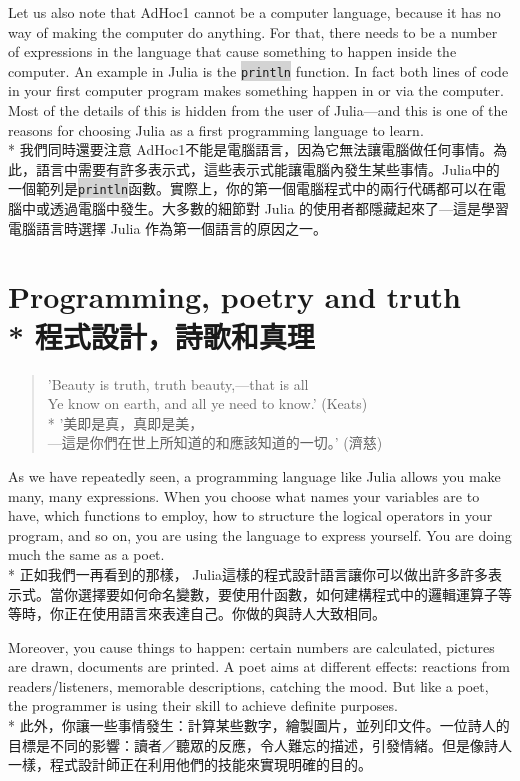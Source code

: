 \documentclass[]{article}
\newcommand{\codequote}[1]{\colorbox{lightgray}{\tt #1}}
\begin{document}
{\color{gray}Let us also note that AdHoc1 cannot be a computer language, because it has no way of making the computer do anything. For that, there needs to be a number of expressions in the language that cause something to happen inside the computer. An example in Julia is the \codequote{println} function. In fact both lines of code in your first computer program makes something happen in or via the computer. Most of the details of this is hidden from the user of Julia---and this is one of the reasons for choosing Julia as a first programming language to learn.}
\\*
{我們同時還要注意 AdHoc1不能是電腦語言，因為它無法讓電腦做任何事情。為此，語言中需要有許多表示式，這些表示式能讓電腦內發生某些事情。Julia中的一個範列是\codequote{println}函數。實際上，你的第一個電腦程式中的兩行代碼都可以在電腦中或透過電腦中發生。大多數的細節對 Julia 的使用者都隱藏起來了---這是學習電腦語言時選擇 Julia 作為第一個語言的原因之一。}

\section*{{\color{gray}Programming, poetry and truth}
\\*
{程式設計，詩歌和真理}}

\begin{quote}
{\color{gray}	'Beauty is truth, truth beauty,---that is all	 \\
	Ye know on earth, and all ye need to know.' \hspace{3em} (Keats)
}
\\*
{	'美即是真，真即是美， \\
---這是你們在世上所知道的和應該知道的一切。' \hspace{3em} (濟慈)
}
\end{quote}

{\color{gray}As we have repeatedly seen, a programming language like Julia allows you make many, many expressions. When you choose what names your variables are to have, which functions to employ, how to structure the logical operators in your program, and so on, you are using the language to express yourself. You are doing much the same as a poet.}
\\*
{正如我們一再看到的那樣， Julia這樣的程式設計語言讓你可以做出許多許多表示式。當你選擇要如何命名變數，要使用什函數，如何建構程式中的邏輯運算子等等時，你正在使用語言來表達自己。你做的與詩人大致相同。}

{\color{gray}Moreover, you cause things to happen: certain numbers are calculated, pictures are drawn, documents are printed. A poet aims at different effects: reactions from readers/listeners, memorable descriptions, catching the mood. But like a poet, the programmer is using their skill to achieve definite purposes.}
\\*
{此外，你讓一些事情發生：計算某些數字，繪製圖片，並列印文件。一位詩人的目標是不同的影響：讀者／聽眾的反應，令人難忘的描述，引發情緒。但是像詩人一樣，程式設計師正在利用他們的技能來實現明確的目的。}
\end{document}
